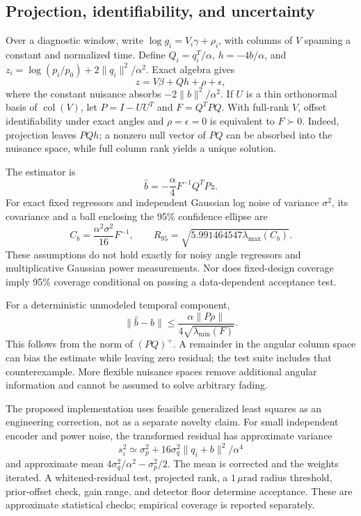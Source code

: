 \documentclass[10pt,journal]{IEEEtran}
\newcommand{\norm}[1]{\lVert#1\rVert}
\newcommand{\um}{\,\mu\mathrm{rad}}
\begin{document}
\subsection{Projection, identifiability, and uncertainty}
Over a diagnostic window, write $\log g_i=V_i\gamma+\rho_i$, with columns of $V$ spanning a constant and normalized time. Define $Q_i=q_i^T/\alpha$, $h=-4b/\alpha$, and $z_i=\log(p_i/p_0)+2\norm{q_i}^2/\alpha^2$. Exact algebra gives
\begin{equation}
 z=V\beta+Qh+\rho+\epsilon,
\end{equation}
where the constant nuisance absorbs $-2\norm b^2/\alpha^2$. If $U$ is a thin orthonormal basis of $\operatorname{col}(V)$, let $P=I-UU^T$ and $F=Q^TPQ$. With full-rank $V$, offset identifiability under exact angles and $\rho=\epsilon=0$ is equivalent to $F\succ0$. Indeed, projection leaves $PQh$; a nonzero null vector of $PQ$ can be absorbed into the nuisance space, while full column rank yields a unique solution.

The estimator is
\begin{equation}
 \widehat b=-\frac{\alpha}{4}F^{-1}Q^TPz.
\end{equation}
For exact fixed regressors and independent Gaussian log noise of variance $\sigma^2$, its covariance and a ball enclosing the 95\% confidence ellipse are
\begin{equation}
 C_b=\frac{\alpha^2\sigma^2}{16}F^{-1},\qquad
 R_{95}=\sqrt{5.991464547\lambda_{\max}(C_b)}.
\end{equation}
These assumptions do not hold exactly for noisy angle regressors and multiplicative Gaussian power measurements. Nor does fixed-design coverage imply 95\% coverage conditional on passing a data-dependent acceptance test.

For a deterministic unmodeled temporal component,
\begin{equation}
 \norm{\widehat b-b}\leq
 \frac{\alpha\norm{P\rho}}{4\sqrt{\lambda_{\min}(F)}}.
\end{equation}
This follows from the norm of $(PQ)^+$. A remainder in the angular column space can bias the estimate while leaving zero residual; the test suite includes that counterexample. More flexible nuisance spaces remove additional angular information and cannot be assumed to solve arbitrary fading.

The proposed implementation uses feasible generalized least squares as an engineering correction, not as a separate novelty claim. For small independent encoder and power noise, the transformed residual has approximate variance
\begin{equation}
 s_i^2\simeq\sigma_p^2+16\sigma_q^2\norm{q_i+b}^2/\alpha^4
\end{equation}
and approximate mean $4\sigma_q^2/\alpha^2-\sigma_p^2/2$. The mean is corrected and the weights iterated. A whitened-residual test, projected rank, a $1\um$ radius threshold, prior-offset check, gain range, and detector floor determine acceptance. These are approximate statistical checks; empirical coverage is reported separately.
\end{document}
